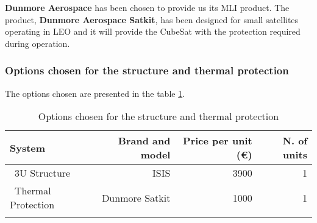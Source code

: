 \textbf{Dunmore Aerospace} has been chosen to provide us its MLI product. The product, \textbf{Dunmore Aerospace Satkit}, has been designed for small satellites operating in LEO and it will provide the CubeSat with the protection required during operation. \cite[Chapter 1, Section 1]{annex4}

\subsubsection{Options chosen for the structure and thermal protection}
The options chosen are presented in the table \ref{structurefinal}.

\begin{longtable}{| l | r | r | r | }
\hline
\rowcolor[gray]{0.80}	\textbf{System} &  \textbf{Brand and model}     & \textbf{Price per unit (\euro)} & \textbf{N. of units}  \\
\hline
\endfirsthead

	   ~3U Structure & ISIS & 3900 & 1 \\
	   \hline
	   ~Thermal Protection & Dunmore Satkit & 1000 & 1\\
	\hline

\caption{Options chosen for the structure and thermal protection}
\label{structurefinal}
\end{longtable}